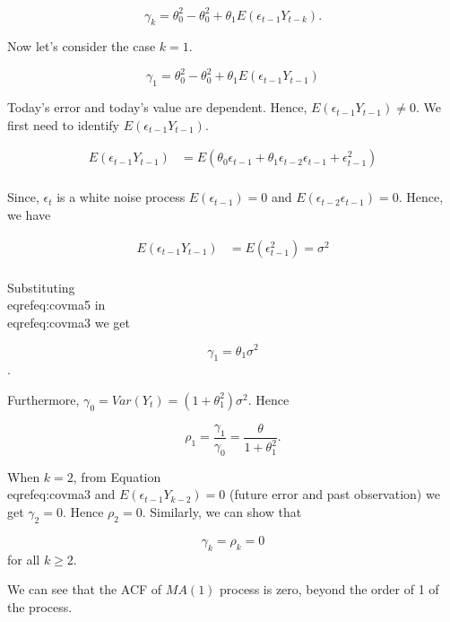 \documentclass[11pt,a4paper,]{article}
\begin{document}
{\begin{equation}
  \label{eq:covma2}
  \gamma_k = \theta_0^2 - \theta_0^2 + \theta_1E(\epsilon_{t-1}Y_{t-k}).
\end{equation}

Now let's consider the case $k=1$.

\begin{equation}
  \label{eq:covma3}
  \gamma_1 = \theta_0^2 - \theta_0^2 + \theta_1E(\epsilon_{t-1}Y_{t-1})
\end{equation}


Today's error and today's value are dependent. Hence, $E(\epsilon_{t-1}Y_{t-1}) \neq 0.$ We first need to identify $E(\epsilon_{t-1}Y_{t-1})$.

\begin{equation}
  \label{eq:covma4}
\begin{aligned}
E(\epsilon_{t-1}Y_{t-1}) &= E(\theta_0 \epsilon_{t-1} + \theta_1 \epsilon_{t-2} \epsilon_{t-1}+ \epsilon_{t-1}^2)\\
\end{aligned}
\end{equation}

Since, {$\epsilon_t$} is a white noise process $E(\epsilon_{t-1}) = 0$ and $E(\epsilon_{t-2} \epsilon_{t-1}) = 0$. Hence, we have

\begin{equation}
  \label{eq:covma5}
\begin{aligned}
E(\epsilon_{t-1}Y_{t-1}) &= E(\epsilon_{t-1}^2)=\sigma^2\\
\end{aligned}
\end{equation}

Substituting \\eqref{eq:covma5} in \\eqref{eq:covma3} we get

$$\gamma_1=\theta_1\sigma^2$$.

Furthermore, $\gamma_0 = Var(Y_t)=  (1+\theta_1^2)\sigma^2$. Hence

$$\rho_1=\frac{\gamma_1}{\gamma_0}=\frac{\theta}{1+\theta_1^2}.$$

When $k=2$, from Equation \\eqref{eq:covma3}  and $E(\epsilon_{t-1}Y_{k-2}) = 0$ (future error and past observation) we get $\gamma_2=0$. Hence $\rho_2=0$. Similarly, we can show that

$$\gamma_k = \rho_k=0$$ for all $k \geq 2$.

We can see that the ACF of $MA(1)$ process is zero, beyond the order of 1 of the process.

}
\end{document}
